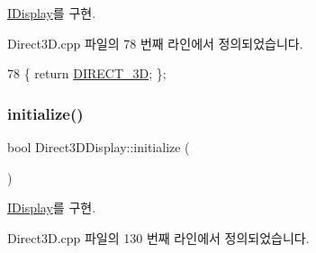 \mbox{\hyperlink{class_i_display_a2c7fd4c6721dd8a6992b78f0c588f6f9}{I\+Display}}를 구현.



Direct3\+D.\+cpp 파일의 78 번째 라인에서 정의되었습니다.


\begin{DoxyCode}
78 \{ \textcolor{keywordflow}{return} \mbox{\hyperlink{_display_8h_aa50f63b0688d0250e0be64d8401d09a0acff887f7ebbcc7cd915719b8b594a56b}{DIRECT\_3D}}; \};
\end{DoxyCode}
\mbox{\label{class_direct3_d_display_a8b8dfd84005816382396677e23d38879}} 
\subsubsection{\texorpdfstring{initialize()}{initialize()}}
{\footnotesize\ttfamily bool Direct3\+D\+Display\+::initialize (\begin{DoxyParamCaption}{ }\end{DoxyParamCaption})\hspace{0.3cm}{\ttfamily [virtual]}}



\mbox{\hyperlink{class_i_display_aa849b5d829138d08cf9efdbb00364a96}{I\+Display}}를 구현.



Direct3\+D.\+cpp 파일의 130 번째 라인에서 정의되었습니다.


